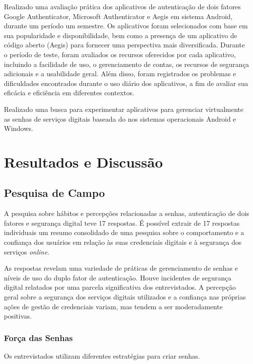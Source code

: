 \documentclass[12pt]{article}
\begin{document}
Realizado uma avaliação prática dos aplicativos de autenticação de dois
fatores Google Authenticator, Microsoft Authenticator e Aegis em sistema
Android, durante um período um semestre. Os aplicativos foram selecionados
com base em sua popularidade e disponibilidade, bem como a presença de um
aplicativo de código aberto (Aegis) para fornecer uma perspectiva mais
diversificada.
Durante o período de teste, foram avaliados os recursos oferecidos por cada
aplicativo, incluindo a facilidade de uso, o gerenciamento de contas, os
recursos de segurança adicionais e a usabilidade geral.
Além disso, foram registrados os problemas e dificuldades encontrados
durante o uso diário dos aplicativos, a fim de avaliar sua eficácia e
eficiência em diferentes contextos.

Realizado uma busca para experimentar aplicativos para gerenciar
virtualmente as senhas de serviços digitais baseada do nos sistemas
operacionais Android e Windows.

\section{Resultados e Discussão}

\subsection{Pesquisa de Campo}

A pesquisa sobre hábitos e percepções relacionadas a senhas, autenticação de dois
fatores e segurança digital teve 17 respostas.
É possível extrair de 17 respostas individuais um resumo consolidado de uma pesquisa
sobre o comportamento e a confiança dos usuários em relação às suas credenciais
digitais e à segurança dos serviços \textit{online}.

As respostas revelam uma variedade de práticas de gerenciamento de senhas e níveis
de uso do duplo fator de autenticação.
Houve incidentes de segurança digital relatados por uma parcela significativa dos
entrevistados.
A percepção geral sobre a segurança dos serviços digitais utilizados e a confiança
nas próprias ações de gestão de credenciais variam, mas tendem a ser moderadamente
positivas.

\subsubsection{Força das Senhas}

Os entrevistados utilizam diferentes estratégias para criar senhas.
\end{document}
